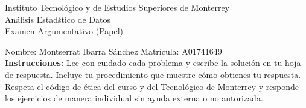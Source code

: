 \documentclass[10pt]{report}
\begin{document}
\newpage



\begin{center}
{\large Instituto Tecnol\'{o}gico y de Estudios Superiores de Monterrey \\
An\'alisis Estad\'stico de Datos } \\
Examen Argumentativo (Papel)
\end{center}

Nombre: \underline{\hspace*{.2in}}
Montserrat Ibarra S\'anchez
\underline{\hspace*{.2in}} \quad Matr\'icula:\underline{\hspace*{.2in}}
A01741649
\underline{\hspace*{.2in}} \\

{\bf Instrucciones:} Lee con cuidado cada problema y escribe la soluci\'on
en tu hoja de respuesta. Incluye tu procedimiento que muestre c\'omo obtienes tu respuesta.  Respeta el c\'odigo de \'etica del curso y del Tecnol\'ogico de Monterrey y responde los ejercicios de manera individual sin ayuda externa o no autorizada.
\end{document}
